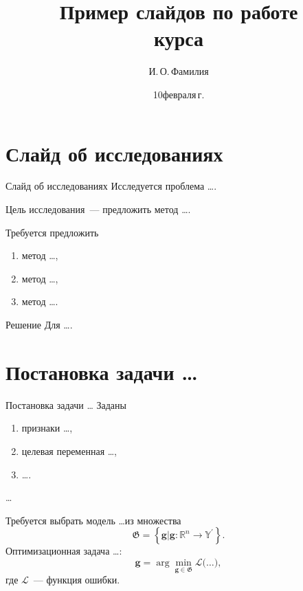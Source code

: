 \documentclass[10pt,pdf,hyperref={unicode}]{beamer}
\title[Пример слайдов по работе]{Пример слайдов по работе \\ курса}
\author{И.\,О.\,Фамилия}
\institute[]{Московский физико-технический институт}
\date[2022]{\small 10\;февраля\;2022\,г.}
\begin{document}
\begin{frame}
\titlepage
\end{frame}

\section{Слайд об исследованиях}
\begin{frame}{Слайд об исследованиях}
\bigskip
Исследуется проблема \ldots.
\begin{block}{Цель исследования~---}
предложить метод \ldots.
\end{block}
\begin{block}{Требуется предложить}
\justifying
\begin{enumerate}[1)]
\item метод \ldots,
\item метод \ldots,
\item метод \ldots.
\end{enumerate}
\end{block}
\begin{block}{Решение}
Для \ldots.
\end{block}
\end{frame}

\section{Постановка задачи \ldots}
\begin{frame}{Постановка задачи \ldots}
Заданы
\begin{enumerate}[1)]
    \item признаки \ldots,
    \item целевая переменная \ldots,
    \item \ldots.
\end{enumerate}

\ldots

\bigskip

Требуется выбрать модель \ldots из множества
\[
	\mathfrak{G} = \left\{\mathbf{g}| \mathbf{g}:\mathbb{R}^{n} \to \mathbb{Y}^\prime\right\}.
\]
Оптимизационная задача \ldots:
\[
	\mathbf{g} = \arg\min_{\mathbf{g} \in \mathfrak{G}} \mathcal{L}\bigr(\ldots\bigr),
\]
где $\mathcal{L}$~--- функция ошибки.

\bigskip
{}
\end{frame}
\end{document}
